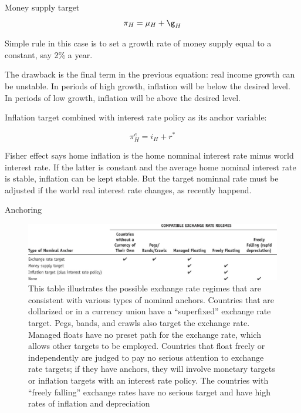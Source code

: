 \documentclass[
  ignorenonframetext,
]{beamer}
\begin{document}
\begin{frame}{Money supply target}
\label{money-supply-target}
\begin{equation}
\pi_H=\mu_H+\g_H
\end{equation}

Simple rule in this case is to set a growth rate of money supply equal
to a constant, say 2\% a year.

The drawback is the final term in the previous equation: real income
growth can be unstable. In periods of high growth, inflation will be
below the desired level. In periods of low growth, inflation will be
above the desired level.
\end{frame}

\begin{frame}{Inflation target}
\label{inflation-target}
combined with interest rate policy as its anchor variable:

\begin{equation}
\pi^e_H=i_H+r^*
\end{equation}

Fisher effect says home inflation is the home nomninal interest rate
minus world interest rate. If the latter is constant and the average
home nominal interest rate is stable, inflation can be kept stable. But
the target nominnal rate must be adjusted if the world real interest
rate changes, as recently happend.
\end{frame}

\begin{frame}[s]{Anchoring}
\label{anchoring}
\begin{figure}[H]

{\centering \includegraphics{Picture7.jpg}

}

\caption{This table illustrates the possible exchange rate regimes that
are consistent with various types of nominal anchors. Countries that are
dollarized or in a currency union have a ``superfixed'' exchange rate
target. Pegs, bands, and crawls also target the exchange rate. Managed
floats have no preset path for the exchange rate, which allows other
targets to be employed. Countries that float freely or independently are
judged to pay no serious attention to exchange rate targets; if they
have anchors, they will involve monetary targets or inflation targets
with an interest rate policy. The countries with ``freely falling''
exchange rates have no serious target and have high rates of inflation
and depreciation}

\end{figure}%
\end{frame}
\end{document}
